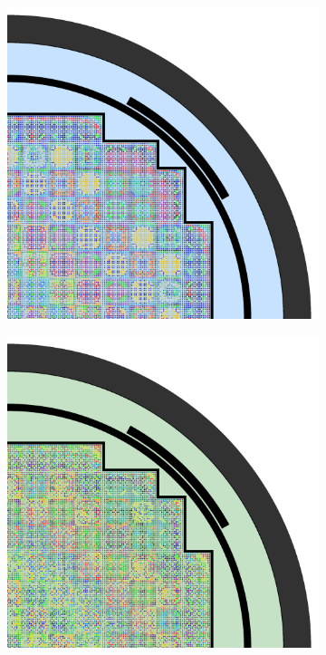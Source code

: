 \begin{appendices}
\begin{figure}[h!]
\begin{subfigure}{0.48\textwidth}
  \includegraphics[width=0.85\linewidth]{figures/unsupervised/geometries/without-features/16-clusters/combined/full-core}
  \caption{}
  \label{fig:no-features-full-core-combined-16}
\end{subfigure}
\begin{subfigure}{0.48\textwidth}
  \centering
  \includegraphics[width=0.85\linewidth]{figures/unsupervised/geometries/without-features/32-clusters/pinch/full-core}
  \caption{}
  \label{fig:no-features-full-core-pinch-32}
\end{subfigure}%

\end{figure}
\end{appendices}
